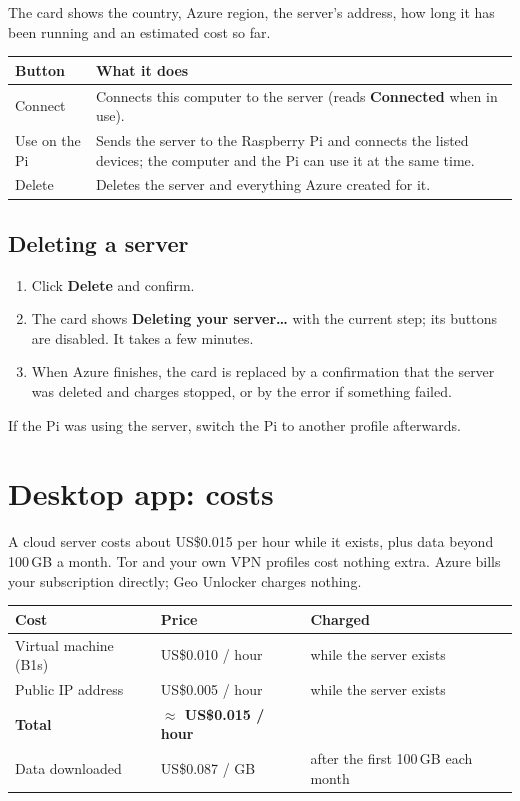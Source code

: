\documentclass[11pt,a4paper]{article}
\newcommand{\ui}[1]{\textbf{#1}}            %
\newcommand{\usd}[1]{US\$#1}
\begin{document}
The card shows the country, Azure region, the server's address, how long it has been running and an estimated cost so far.

\begin{center}
\begin{tabularx}{\linewidth}{@{}l L@{}}
\toprule
\textbf{Button} & \textbf{What it does} \\
\midrule
Connect & Connects this computer to the server (reads \ui{Connected} when in use). \\
Use on the Pi & Sends the server to the Raspberry Pi and connects the listed devices; the computer and the Pi can use it at the same time. \\
Delete & Deletes the server and everything Azure created for it. \\
\bottomrule
\end{tabularx}
\end{center}

\subsection{Deleting a server}

\begin{enumerate}
  \item Click \ui{Delete} and confirm.
  \item The card shows \ui{Deleting your server\ldots} with the current step; its buttons are disabled. It takes a few minutes.
  \item When Azure finishes, the card is replaced by a confirmation that the server was deleted and charges stopped, or by the error if something failed.
\end{enumerate}

If the Pi was using the server, switch the Pi to another profile afterwards.

\section{Desktop app: costs}\label{sec:costs}

A cloud server costs about \usd{0.015} per hour while it exists, plus data beyond 100\,GB a month. Tor and your own VPN profiles cost nothing extra. Azure bills your subscription directly; Geo Unlocker charges nothing.

\begin{center}
\begin{tabularx}{\linewidth}{@{}L l l@{}}
\toprule
\textbf{Cost} & \textbf{Price} & \textbf{Charged} \\
\midrule
Virtual machine (B1s) & \usd{0.010} / hour & while the server exists \\
Public IP address & \usd{0.005} / hour & while the server exists \\
\midrule
\textbf{Total} & \textbf{$\approx$ \usd{0.015} / hour} & \\
\midrule
Data downloaded & \usd{0.087} / GB & after the first 100\,GB each month \\
\bottomrule
\end{tabularx}
\end{center}
\end{document}
